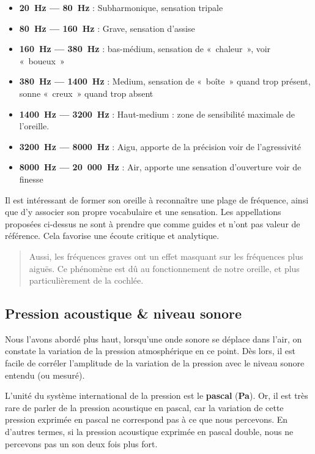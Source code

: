 \documentclass[
]{book}
\providecommand{\tightlist}{%
  \setlength{\itemsep}{0pt}\setlength{\parskip}{0pt}}
\begin{document}
\begin{itemize}
\tightlist
\item
  \textbf{20~Hz --- 80~Hz} : Subharmonique, sensation tripale
\item
  \textbf{80~Hz --- 160~Hz} : Grave, sensation d'assise
\item
  \textbf{160~Hz --- 380~Hz} : bas-médium, sensation de «~chaleur~», voir «~boueux~»
\item
  \textbf{380~Hz --- 1400~Hz} : Medium, sensation de «~boîte~» quand trop présent, sonne «~creux~» quand trop absent
\item
  \textbf{1400~Hz --- 3200~Hz} : Haut-medium : zone de sensibilité maximale de l'oreille.
\item
  \textbf{3200~Hz --- 8000~Hz} : Aigu, apporte de la précision voir de l'agressivité
\item
  \textbf{8000~Hz --- 20~000~Hz} : Air, apporte une sensation d'ouverture voir de finesse
\end{itemize}

Il est intéressant de former son oreille à reconnaître une plage de fréquence, ainsi que d'y associer son propre vocabulaire et une sensation. Les appellations proposées ci-dessus ne sont à prendre que comme guides et n'ont pas valeur de référence. Cela favorise une écoute critique et analytique.

\begin{quote}
Aussi, les fréquences graves ont un effet masquant sur les fréquences plus aiguës. Ce phénomène est dû au fonctionnement de notre oreille, et plus particulièrement de la cochlée.
\end{quote}

\hypertarget{pression-acoustique-niveau-sonore}{%
\subsection{Pression acoustique \& niveau sonore}\label{pression-acoustique-niveau-sonore}}

Nous l'avons abordé plus haut, lorsqu'une onde sonore se déplace dans l'air, on constate la variation de la pression atmosphérique en ce point. Dès lors, il est facile de corréler l'amplitude de la variation de la pression avec le niveau sonore entendu (ou mesuré).

L'unité du système international de la pression est le \textbf{pascal} (\textbf{Pa}). Or, il est très rare de parler de la pression acoustique en pascal, car la variation de cette pression exprimée en pascal ne correspond pas à ce que nous percevons. En d'autres termes, si la pression acoustique exprimée en pascal double, nous ne percevons pas un son deux fois plus fort.
\end{document}
